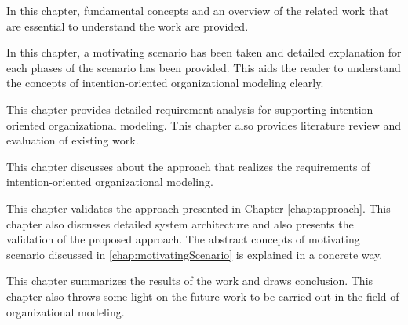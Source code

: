 \begin{description} [labelwidth = 0.07\textwidth]
	\item[Chapter ~\ref{chap:fundamentals} -- \nameref{chap:fundamentals}:] In this chapter, fundamental concepts and an overview of the related work that are essential to understand the work are provided.
	\item[Chapter ~\ref{chap:motivatingScenario} -- \nameref{chap:motivatingScenario}:] In this chapter, a motivating scenario has been taken and detailed explanation for each phases of the scenario has been provided. This aids the reader to understand the concepts of intention-oriented organizational modeling clearly. 
	\item [Chapter ~\ref{chap:analysis} --\textbf{Requirements for Supporting Intention-oriented Organizational Modeling}:] This chapter provides detailed requirement analysis for supporting intention-oriented organizational modeling. This chapter also provides literature review and evaluation of existing work.
	\item[Chapter ~\ref{chap:approach} -- \nameref{chap:approach}:] This chapter discusses about the approach that realizes the requirements  of intention-oriented organizational modeling.
	\item[Chapter ~\ref{chap:casestudy} -- \nameref{chap:casestudy}:] This chapter validates the approach presented in Chapter \ref{chap:approach}. This chapter also discusses detailed system architecture and also presents the validation of the proposed approach. The abstract concepts of motivating scenario discussed in \ref{chap:motivatingScenario} is explained in a concrete way.	
	\item[Chapter ~\ref{chap:conclusion} -- \nameref{chap:conclusion}:] This chapter summarizes the results of the work and draws conclusion. This chapter also throws some light on the future work to be carried out in the field of organizational modeling. 
\end{description}